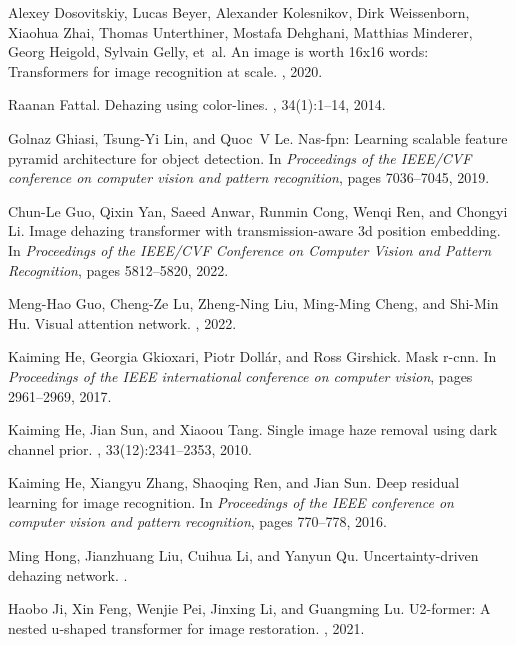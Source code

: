 \documentclass[10pt,twocolumn,letterpaper]{article}
\begin{document}
\begin{thebibliography}{10}
Alexey Dosovitskiy, Lucas Beyer, Alexander Kolesnikov, Dirk Weissenborn,
  Xiaohua Zhai, Thomas Unterthiner, Mostafa Dehghani, Matthias Minderer, Georg
  Heigold, Sylvain Gelly, et~al.
\newblock An image is worth 16x16 words: Transformers for image recognition at
  scale.
, 2020.

Raanan Fattal.
\newblock Dehazing using color-lines.
, 34(1):1--14, 2014.

Golnaz Ghiasi, Tsung-Yi Lin, and Quoc~V Le.
\newblock Nas-fpn: Learning scalable feature pyramid architecture for object
  detection.
\newblock In {\em Proceedings of the IEEE/CVF conference on computer vision and
  pattern recognition}, pages 7036--7045, 2019.

Chun-Le Guo, Qixin Yan, Saeed Anwar, Runmin Cong, Wenqi Ren, and Chongyi Li.
\newblock Image dehazing transformer with transmission-aware 3d position
  embedding.
\newblock In {\em Proceedings of the IEEE/CVF Conference on Computer Vision and
  Pattern Recognition}, pages 5812--5820, 2022.

Meng-Hao Guo, Cheng-Ze Lu, Zheng-Ning Liu, Ming-Ming Cheng, and Shi-Min Hu.
\newblock Visual attention network.
, 2022.

Kaiming He, Georgia Gkioxari, Piotr Doll{\'a}r, and Ross Girshick.
\newblock Mask r-cnn.
\newblock In {\em Proceedings of the IEEE international conference on computer
  vision}, pages 2961--2969, 2017.

Kaiming He, Jian Sun, and Xiaoou Tang.
\newblock Single image haze removal using dark channel prior.
,
  33(12):2341--2353, 2010.

Kaiming He, Xiangyu Zhang, Shaoqing Ren, and Jian Sun.
\newblock Deep residual learning for image recognition.
\newblock In {\em Proceedings of the IEEE conference on computer vision and
  pattern recognition}, pages 770--778, 2016.

Ming Hong, Jianzhuang Liu, Cuihua Li, and Yanyun Qu.
\newblock Uncertainty-driven dehazing network.
.

Haobo Ji, Xin Feng, Wenjie Pei, Jinxing Li, and Guangming Lu.
\newblock U2-former: A nested u-shaped transformer for image restoration.
, 2021.


\end{thebibliography}
\end{document}
